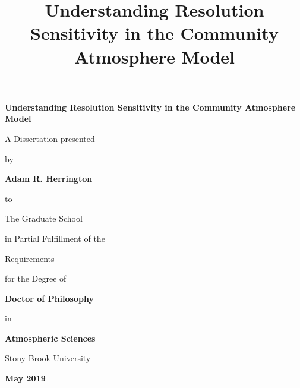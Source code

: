 \documentclass[12pt]{article}
\begin{document}
\title{\bf{Understanding Resolution Sensitivity in the Community Atmosphere Model}}

\vspace*{3\baselineskip}
\centerline{\bf{Understanding Resolution Sensitivity in the Community Atmosphere Model}}
\vspace*{1\baselineskip}
\centerline{A Dissertation presented}
\vspace*{1\baselineskip}
\centerline{by} 
\vspace*{1\baselineskip}
\centerline{\bf{Adam R. Herrington}}
\vspace*{1\baselineskip}
\centerline{to} 
\vspace*{1\baselineskip}
\centerline{The Graduate School}
\vspace*{1\baselineskip}
\centerline{in Partial Fulfillment of the}
\vspace*{1\baselineskip}
\centerline{Requirements}
\vspace*{1\baselineskip}
\centerline{for the Degree of}
\vspace*{1\baselineskip}
\centerline{\bf{Doctor of Philosophy}}
\vspace*{1\baselineskip}
\centerline{in}
\vspace*{1\baselineskip}
\centerline{\bf{Atmospheric Sciences}}
\vspace*{2\baselineskip}
\centerline{Stony Brook University}
\vspace*{2\baselineskip}
\centerline{\bf{May 2019}}     



\newpage
{}
\setcounter{page}{2}
\end{document}
